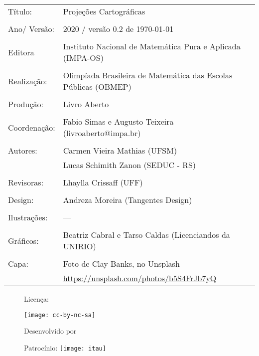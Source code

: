 \begin{tabular}{p{}p{}}
Título: & Projeções Cartográficas\\
\\
Ano/ Versão: & 2020 / versão 0.2 de \today\\
\\
Editora & Instituto Nacional de Matem\'atica Pura e Aplicada (IMPA-OS)\\
\\
Realização:& Olimp\'iada Brasileira de Matem\'atica das Escolas P\'ublicas (OBMEP)\\
\\
Produção:& Livro Aberto\\
\\
Coordenação:& Fabio Simas e Augusto Teixeira (livroaberto@impa.br)\\
\\
  Autores: & Carmen Vieira Mathias (UFSM)\\
             & Lucas Schimith Zanon (SEDUC - RS)\\
\\
Revisoras: &  Lhaylla Crissaff (UFF) \\
\\
Design: & Andreza Moreira (Tangentes Design) \\
\\
  Ilustrações: & --- \\ 
\\
Gráficos: & Beatriz Cabral e Tarso Caldas (Licenciandos da UNIRIO)\\
\\
  Capa: & Foto de Clay Banks, no Unsplash \\
  & \url{https://unsplash.com/photos/b5S4FrJb7yQ} \\
\end{tabular}
\vspace{.5cm}


\begin{figure}[b]
\begin{minipage}[l]{5cm}
\centering

{\large Licença:}

  \texttt{[image: cc-by-nc-sa]}
\end{minipage}\hfill
\begin{minipage}[c]{5cm}
\centering
{\large Desenvolvido por}

\end{minipage}
\begin{minipage}[r]{5cm}
\centering

{\large Patrocínio:}
  \vspace{1em}
  \texttt{[image: itau]}
\end{minipage}
\end{figure}


